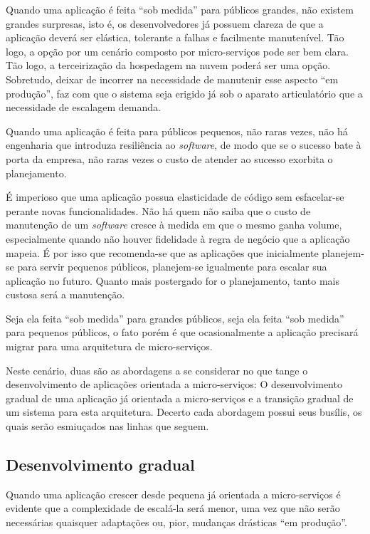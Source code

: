 Quando uma aplicação é feita ``sob medida'' para públicos grandes, não existem grandes surpresas, isto é, os desenvolvedores já possuem clareza de que a aplicação deverá ser elástica, tolerante a falhas e facilmente manutenível. Tão logo, a opção por um cenário composto por micro-serviços pode ser bem clara. Tão logo, a terceirização da hospedagem na nuvem poderá ser uma opção. Sobretudo, deixar de incorrer na necessidade de manutenir esse aspecto ``em produção'', faz com que o sistema seja erigido já sob o aparato articulatório que a necessidade de escalagem demanda.

Quando uma aplicação é feita para públicos pequenos, não raras vezes, não há engenharia que introduza resiliência ao \textit{software}, de modo que se o sucesso bate à porta da empresa, não raras vezes o custo de atender ao sucesso exorbita o planejamento.

É imperioso que uma aplicação possua elasticidade de código sem esfacelar-se perante novas funcionalidades. Não há quem não saiba que o custo de manutenção de um \textit{software} cresce à medida em que o mesmo ganha volume, especialmente quando não houver fidelidade à regra de negócio que a aplicação mapeia. É por isso que recomenda-se que as aplicações que inicialmente planejem-se para servir pequenos públicos, planejem-se igualmente para escalar sua aplicação no futuro. Quanto mais postergado for o planejamento, tanto mais custosa será a manutenção.

Seja ela feita ``sob medida'' para grandes públicos, seja ela feita ``sob medida'' para pequenos públicos, o fato porém é que ocasionalmente a aplicação precisará migrar para uma arquitetura de micro-serviços.

Neste cenário, duas são as abordagens a se considerar no que tange o desenvolvimento de aplicações orientada a micro-serviços: O desenvolvimento gradual de uma aplicação já orientada a micro-serviços e a transição gradual de um sistema para esta arquitetura. Decerto cada abordagem possui seus busílis, os quais serão esmiuçados nas linhas que seguem.

\subsection{Desenvolvimento gradual}

Quando uma aplicação crescer desde pequena já orientada a micro-serviços é evidente que a complexidade de escalá-la será menor, uma vez que não serão necessárias quaisquer adaptações ou, pior, mudanças drásticas ``em produção''.

